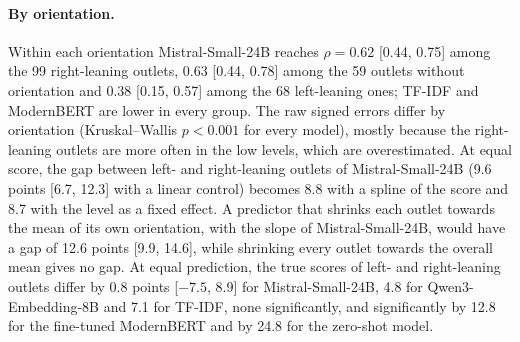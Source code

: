 \documentclass[11pt,a4paper]{article}
\begin{document}
\paragraph{By orientation.} Within each orientation Mistral-Small-24B reaches $\rho = 0.62$ [0.44, 0.75] among the 99
right-leaning outlets, 0.63 [0.44, 0.78] among the 59 outlets without orientation and 0.38 [0.15, 0.57] among the 68
left-leaning ones; TF-IDF and ModernBERT are lower in every group. The raw signed errors differ by orientation
(Kruskal--Wallis $p < 0.001$ for every model), mostly because the right-leaning outlets are more often in the low
levels, which are overestimated. At equal score, the gap between left- and right-leaning outlets of Mistral-Small-24B
(9.6 points [6.7, 12.3] with a linear control) becomes 8.8 with a spline of the score and 8.7 with the level as a fixed
effect. A predictor that shrinks each outlet towards the mean of its own orientation, with the slope of
Mistral-Small-24B, would have a gap of 12.6 points [9.9, 14.6], while shrinking every outlet towards the overall mean
gives no gap. At equal prediction, the true scores of left- and right-leaning outlets differ by 0.8 points [$-7.5$, 8.9]
for Mistral-Small-24B, 4.8 for Qwen3-Embedding-8B and 7.1 for TF-IDF, none significantly, and significantly by 12.8 for
the fine-tuned ModernBERT and by 24.8 for the zero-shot model.
\end{document}
